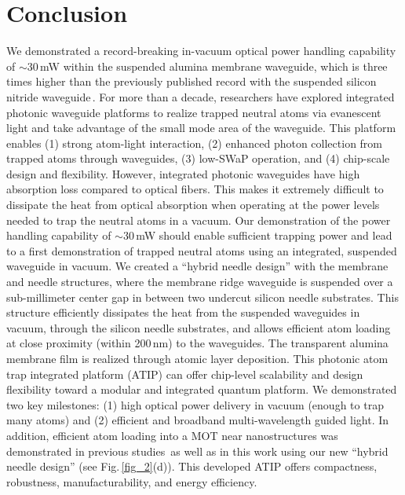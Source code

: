 \documentclass{osa-article}
\begin{document}
\section{Conclusion}
We demonstrated a record-breaking in-vacuum optical power handling capability of $\sim$30\,mW within the suspended alumina membrane waveguide, which is three times higher than the previously published record with the suspended silicon nitride waveguide\,\cite{Kimble20}. For more than a decade, researchers have explored integrated photonic waveguide platforms to realize trapped neutral atoms via evanescent light and take advantage of the small mode area of the waveguide. This platform enables (1) strong atom-light interaction, (2) enhanced photon collection from trapped atoms through waveguides, (3) low-SWaP operation, and (4) chip-scale design and flexibility. However, integrated photonic waveguides have high absorption loss compared to optical fibers. This makes it extremely difficult to dissipate the heat from optical absorption when operating at the power levels needed to trap the neutral atoms in a vacuum.  Our demonstration of the power handling capability of $\sim$30\,mW should enable sufficient trapping power and lead to a first demonstration of trapped neutral atoms using an integrated, suspended waveguide in vacuum.
	We created a ``hybrid needle design'' with the membrane and needle structures, where the membrane ridge waveguide is suspended over a sub-millimeter center gap in between two undercut silicon needle substrates. This structure efficiently dissipates the heat from the suspended waveguides in vacuum, through the silicon needle substrates, and allows efficient atom loading at close proximity (within 200\,nm) to the waveguides. The transparent alumina membrane film is realized through atomic layer deposition. This photonic atom trap integrated platform (ATIP) can offer chip-level scalability and design flexibility toward a modular and integrated quantum platform. We demonstrated two key milestones: (1) high optical power delivery in vacuum (enough to trap many atoms) and (2) efficient and broadband multi-wavelength guided light. In addition, efficient atom loading into a MOT near nanostructures was demonstrated in previous studies\,\cite{Lee20, Jau17} as well as in this work using our new ``hybrid needle design'' (see Fig.\,\ref{fig_2}(d)). This developed ATIP offers compactness, robustness, manufacturability, and energy efficiency.
\end{document}
